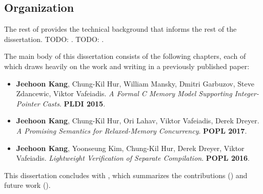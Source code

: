 \subsection{Organization}

The rest of  provides the technical background that informs the rest of the
dissertation.  TODO: .  TODO: .

The main body of this dissertation consists of the following chapters, each of which draws heavily
on the work and writing in a previously published paper:

\begin{itemize}
\item {}

  \cite{intptrcast} \textbf{Jeehoon Kang}, Chung-Kil Hur, William Mansky, Dmitri Garbuzov,
  Steve Zdancewic, Viktor Vafeiadis.  \emph{A Formal C Memory Model Supporting Integer-Pointer
    Casts}.  \textbf{PLDI 2015}.  

\item {}

  \cite{promising} \textbf{Jeehoon Kang}, Chung-Kil Hur, Ori Lahav, Viktor Vafeiadis, Derek
  Dreyer.  \emph{A Promising Semantics for Relaxed-Memory Concurrency}.  \textbf{POPL 2017}.

\item {}

  \cite{sepcomp} \textbf{Jeehoon Kang}, Yoonseung Kim, Chung-Kil Hur, Derek Dreyer, Viktor
  Vafeiadis.  \emph{Lightweight Verification of Separate Compilation}.  \textbf{POPL 2016}.
\end{itemize}

This dissertation concludes with , which summarizes the contributions
() and future work ().


%


